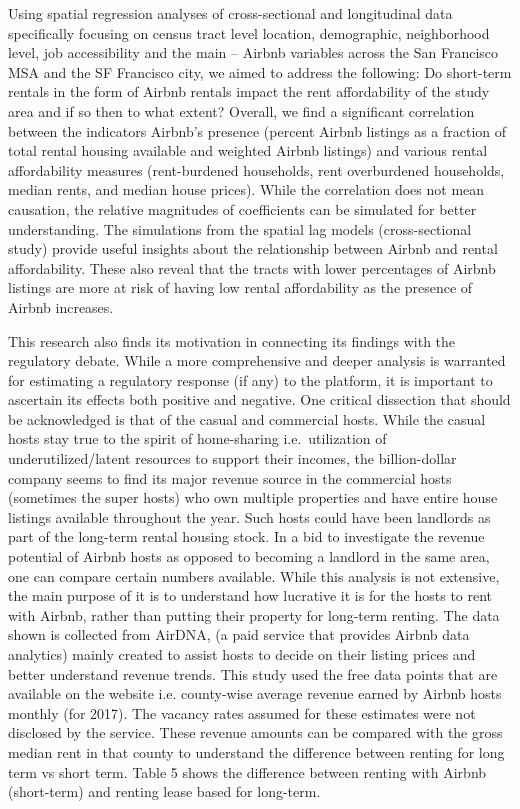 \documentclass[10pt,letterpaper,onecolumn]{article}
\begin{document}
Using spatial regression analyses of cross-sectional and longitudinal
data specifically focusing on census tract level location, demographic,
neighborhood level, job accessibility and the main -- Airbnb variables
across the San Francisco MSA and the SF Francisco city, we aimed to
address the following: Do short-term rentals in the form of Airbnb
rentals impact the rent affordability of the study area and if so then
to what extent? Overall, we find a significant correlation between the
indicators Airbnb's presence (percent Airbnb listings as a fraction of
total rental housing available and weighted Airbnb listings) and various
rental affordability measures (rent-burdened households, rent
overburdened households, median rents, and median house prices). While
the correlation does not mean causation, the relative magnitudes of
coefficients can be simulated for better understanding. The simulations
from the spatial lag models (cross-sectional study) provide useful
insights about the relationship between Airbnb and rental affordability.
These also reveal that the tracts with lower percentages of Airbnb
listings are more at risk of having low rental affordability as the
presence of Airbnb increases.

This research also finds its motivation in connecting its findings with
the regulatory debate. While a more comprehensive and deeper analysis is
warranted for estimating a regulatory response (if any) to the platform,
it is important to ascertain its effects both positive and negative. One
critical dissection that should be acknowledged is that of the casual
and commercial hosts. While the casual hosts stay true to the spirit of
home-sharing i.e.\ utilization of underutilized/latent resources to
support their incomes, the billion-dollar company seems to find its
major revenue source in the commercial hosts (sometimes the super hosts)
who own multiple properties and have entire house listings available
throughout the year. Such hosts could have been landlords as part of the
long-term rental housing stock. In a bid to investigate the revenue
potential of Airbnb hosts as opposed to becoming a landlord in the same
area, one can compare certain numbers available. While this analysis is
not extensive, the main purpose of it is to understand how lucrative it
is for the hosts to rent with Airbnb, rather than putting their property
for long-term renting. The data shown is collected from AirDNA, (a paid
service that provides Airbnb data analytics) mainly created to assist
hosts to decide on their listing prices and better understand revenue
trends. This study used the free data points that are available on the
website i.e. county-wise average revenue earned by Airbnb hosts monthly
(for 2017). The vacancy rates assumed for these estimates were not
disclosed by the service. These revenue amounts can be compared with the
gross median rent in that county to understand the difference between
renting for long term vs short term. Table 5 shows the difference
between renting with Airbnb (short-term) and renting lease based for
long-term.
\end{document}
